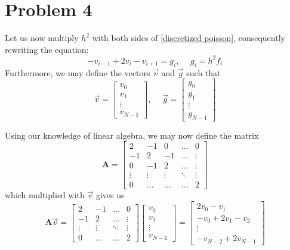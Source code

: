 \documentclass[english,notitlepage]{revtex4-1}  %
\begin{document}
\section*{Problem 4}
Let us now multiply $h^2$ with both sides of \cref{discretized poisson}, consequently rewriting the equation:
\begin{equation}
    -v_{i-1} + 2v_i - v_{i+1} = g_i, \hspace{15pt} g_i = h^2f_i \label{g_i define}
\end{equation}
Furthermore, we may define the vectors $\vec{v}$ and $\vec{g}$ such that
\begin{equation}
    \vec{v} = \begin{bmatrix}
        v_0 \\
        v_1 \\
        \vdots \\
        v_{N-1}
    \end{bmatrix}, \hspace{15pt} \vec{g} = \begin{bmatrix}
        g_0 \\
        g_1 \\
        \vdots \\
        g_{N-1}
    \end{bmatrix}
\end{equation}

Using our knowledge of linear algebra, we may now define the matrix
\begin{equation}
    \textbf{A} = \begin{bmatrix}
        2 & -1 & 0 & \ldots & 0 \\
        -1 & 2 & -1 & \ldots & \vdots \\
        0 & -1 & 2 & \ldots & \vdots \\
        \vdots&\vdots&\vdots&\ddots & \vdots \\
        0 & \ldots&\ldots & \ldots & 2
    \end{bmatrix}
\end{equation}
which multiplied with $\vec{v}$ gives us
\begin{equation}
    \textbf{A}\vec{v} = \begin{bmatrix}
        2 & -1 & \ldots & 0 \\
        -1 & 2 & \ldots & \vdots \\
        \vdots&\vdots&\ddots&\vdots \\
        0 & \ldots & \ldots & 2
    \end{bmatrix} \begin{bmatrix}
        v_0 \\
        v_1 \\
        \vdots \\
        v_{N-1}
    \end{bmatrix} = \begin{bmatrix}
        2v_0 - v_1 \\
        -v_0 + 2v_1 -v_2 \\
        \vdots\\
        -v_{N-2}+2v_{N-1}
    \end{bmatrix}
\end{equation}
\end{document}

